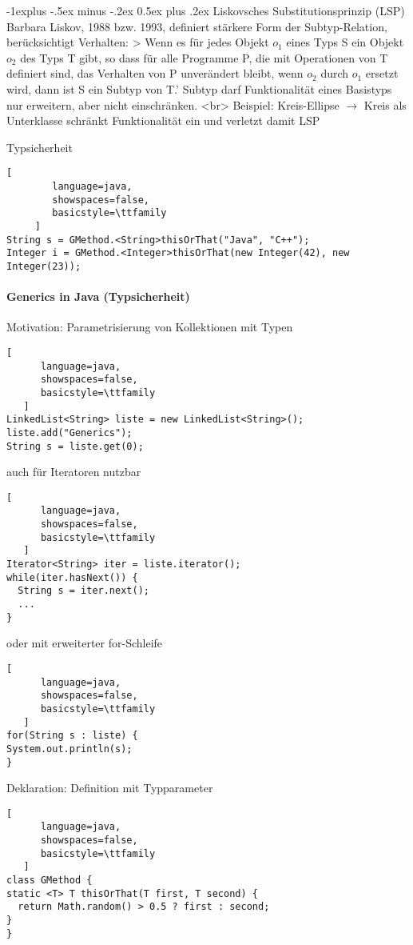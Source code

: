 \documentclass[10pt]{article}
\makeatletter
\renewcommand{\subsection}{\@startsection{subsection}{2}{0mm}%
                                {-1explus -.5ex minus -.2ex}%
                                {0.5ex plus .2ex}%
                                {\normalfont\normalsize\bfseries}}
\makeatother
\begin{document}
\subsection{Liskovsches Substitutionsprinzip (LSP)}
Barbara Liskov, 1988 bzw. 1993, definiert stärkere Form der Subtyp-Relation, berücksichtigt Verhalten:
> Wenn es für jedes Objekt $o_1$ eines Typs S ein Objekt $o_2$ des Typs T gibt, so dass für alle Programme P, die mit Operationen von T definiert sind, das Verhalten von P unverändert bleibt, wenn $o_2$ durch $o_1$ ersetzt wird, dann ist S ein Subtyp von T.'
Subtyp darf Funktionalität eines Basistyps nur erweitern, aber nicht einschränken. <br>
Beispiel: Kreis-Ellipse $\rightarrow$ Kreis als Unterklasse schränkt Funktionalität ein und verletzt damit LSP

Typsicherheit
\begin{lstlisting}[
        language=java,
        showspaces=false,
        basicstyle=\ttfamily
     ]
String s = GMethod.<String>thisOrThat("Java", "C++");
Integer i = GMethod.<Integer>thisOrThat(new Integer(42), new Integer(23));
\end{lstlisting}


\paragraph{Generics in Java (Typsicherheit)}
Motivation: Parametrisierung von Kollektionen mit Typen
\begin{lstlisting}[
      language=java,
      showspaces=false,
      basicstyle=\ttfamily
   ]
LinkedList<String> liste = new LinkedList<String>();
liste.add("Generics");
String s = liste.get(0);
\end{lstlisting}

auch für Iteratoren nutzbar
\begin{lstlisting}[
      language=java,
      showspaces=false,
      basicstyle=\ttfamily
   ]
Iterator<String> iter = liste.iterator();
while(iter.hasNext()) {
  String s = iter.next();
  ...
}
\end{lstlisting}

oder mit erweiterter for-Schleife
\begin{lstlisting}[
      language=java,
      showspaces=false,
      basicstyle=\ttfamily
   ]
for(String s : liste) {
System.out.println(s);
}
\end{lstlisting}


Deklaration: Definition mit Typparameter
\begin{lstlisting}[
      language=java,
      showspaces=false,
      basicstyle=\ttfamily
   ]
class GMethod {
static <T> T thisOrThat(T first, T second) {
  return Math.random() > 0.5 ? first : second;
}
}
\end{lstlisting}
\end{document}
